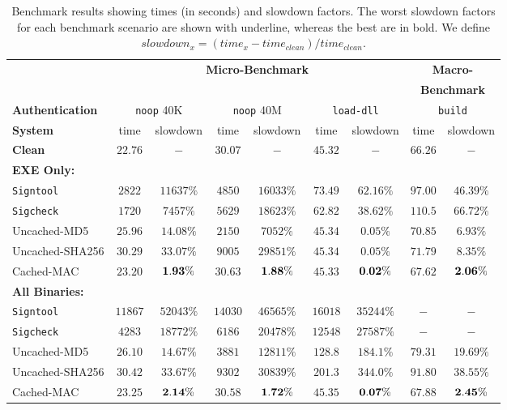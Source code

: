 \begin{sidewaystable}
\centering
\begin{tabular}{|l||c|c||c|c||c|c||c|c|}
\hline
   & \multicolumn{6}{|c||}{{\bf Micro-Benchmark}} & \multicolumn{2}{|c|}{{\bf Macro-}} \\
   & \multicolumn{6}{|c||}{} & \multicolumn{2}{|c|}{{{\bf Benchmark}}} \\
{\bf Authentication}	& \multicolumn{2}{|c||}{{\tt noop} 40K} & \multicolumn{2}{|c||}{{\tt noop} 40M}
   & \multicolumn{2}{|c||}{{\tt load-dll}} & \multicolumn{2}{|c|}{{\tt build}} \\
{\bf System}    & time & slowdown & time & slowdown
                & time & slowdown & time & slowdown \\
\hline
\hline
{\bf Clean}     & $22.76$ & $-$ & $30.07$ & $-$
                & $45.32$ & $-$ & $66.26$ & $-$ \\
\hline
{\bf EXE Only:} & & & & & & & & \\
{\tt Signtool}  & $2822$ & \underline{$11637\%$} & $4850$ & $16033\%$
                & $73.49$ & \underline{$62.16\%$} & $97.00$ & $46.39\%$ \\
{\tt Sigcheck}  & $1720$ & $7457\%$ & $5629$ & $18623\%$
                & $62.82$ & $38.62\%$ & $110.5$ & \underline{$66.72\%$} \\
Uncached-MD5    & $25.96$ & $14.08\%$ & $2150$ & $7052\%$
                & $45.34$ & $0.05\%$ & $70.85$ & $6.93\%$ \\
Uncached-SHA256 & $30.29$ & $33.07\%$ & $9005$ & \underline{$29851\%$}
                & $45.34$ & $0.05\%$ & $71.79$ & $8.35\%$ \\
Cached-MAC      & $23.20$ & ${\bf 1.93}\%$ & $30.63$ & ${\bf 1.88}\%$
                & $45.33$ & ${\bf 0.02}\%$ & $67.62$ & ${\bf 2.06}\%$ \\
\hline
{\bf All Binaries:} & & & & & & & & \\
{\tt Signtool}  & $11867$ & \underline{$52043\%$} & $14030$ & \underline{$46565\%$}
                & $16018$ & \underline{$35244\%$} & $-$ & $-$ \\
{\tt Sigcheck}  & $4283$ & $18772\%$ & $6186$ & $20478\%$
                & $12548$ & $27587\%$ & $-$ & $-$ \\
Uncached-MD5    & $26.10$ & $14.67\%$ & $3881$ & $12811\%$
                & $128.8$ & $184.1\%$ & $79.31$ & $19.69\%$ \\
Uncached-SHA256 & $30.42$ & $33.67\%$ & $9302$ & $30839\%$
                & $201.3$ & $344.0\%$ & $91.80$ & \underline{$38.55\%$} \\
Cached-MAC      & $23.25$ & ${\bf 2.14\%}$ & $30.58$ & ${\bf 1.72\%}$
                & $45.35$ & ${\bf 0.07\%}$ & $67.88$ & ${\bf 2.45\%}$ \\
\hline
\end{tabular}
\caption{Benchmark results showing times (in seconds) and slowdown factors. The worst slowdown
factors for each benchmark scenario are shown with underline, whereas the best are in bold.
We define $slowdown_x = (time_x - time_{clean}) / time_{clean}$.}
\label{table:bigtable}
\end{sidewaystable}

